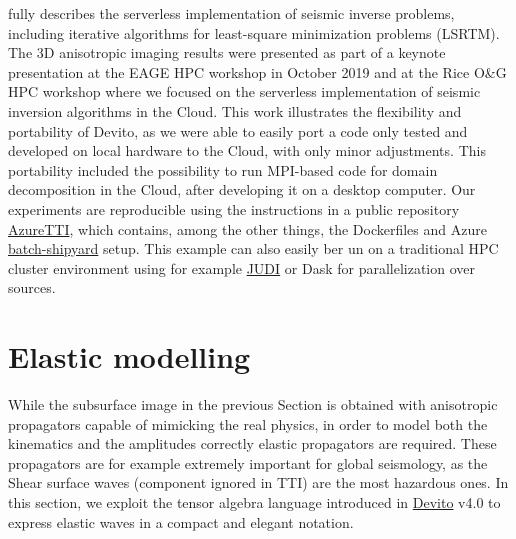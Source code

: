 \documentclass[conference]{IEEEtran}
\begin{document}
\cite{witte2019TPDedas} fully describes the serverless implementation
of seismic inverse problems, including iterative algorithms for
least-square minimization problems (LSRTM). The 3D anisotropic imaging
results were presented as part of a keynote presentation at the EAGE HPC
workshop in October 2019 \cite{herrmann2019EAGEHPCaii} and at the Rice
O\&G HPC workshop \cite{witte2019RHPCssi} where we focused on the
serverless implementation of seismic inversion algorithms in the Cloud.
This work illustrates the flexibility and portability of Devito, as we
were able to easily port a code only tested and developed on local
hardware to the Cloud, with only minor adjustments. This portability
included the possibility to run MPI-based code for domain decomposition
in the Cloud, after developing it on a desktop computer. Our experiments
are reproducible using the instructions in a public repository
\href{https://github.com/slimgroup/Azure2019}{AzureTTI}, which contains,
among the other things, the Dockerfiles and Azure
\href{https://batch-shipyard.readthedocs.io}{batch-shipyard} setup. This
example can also easily ber un on a traditional HPC cluster environment
using for example \href{https://github.com/slimgroup/JUDI.jl}{JUDI} or
Dask \cite{dask} for parallelization over sources.

\section{Elastic modelling}\label{elastic-modelling}

While the subsurface image in the previous Section is obtained with
anisotropic propagators capable of mimicking the real physics, in order
to model both the kinematics and the amplitudes correctly elastic
propagators are required. These propagators are for example extremely
important for global seismology, as the Shear surface waves (component
ignored in TTI) are the most hazardous ones. In this section, we exploit
the tensor algebra language introduced in
\href{https://github.com/devitocodes/devito}{Devito} v4.0 to express
elastic waves in a compact and elegant notation.
\end{document}
